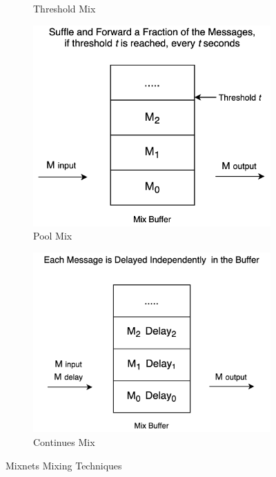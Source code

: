 \documentclass[logo,msc,cyber]{infthesis}   %
\begin{document}
\begin{figure}[h!]
\begin{subfigure}[b]{0.45\textwidth}
       \caption{Threshold Mix}
       \label{fig:Threshold Mix}
   \end{subfigure}
   \hfill
   \begin{subfigure}[b]{0.45\textwidth}
       \centering
       \includegraphics[width=\textwidth]{figures/mixing_techniques/pool.png}
       \caption{Pool Mix}
       \label{fig:Pool Mix}
   \end{subfigure}
   \hfill
   \begin{subfigure}[b]{0.45\textwidth}
       \centering
       \includegraphics[width=\textwidth]{figures/mixing_techniques/continues.png}
       \caption{Continues Mix}
       \label{fig:Continues Mix}
   \end{subfigure}
      \caption{Mixnets Mixing Techniques}
      \label{fig:mixnets-mixing-techniques}
\end{figure}
\end{document}
